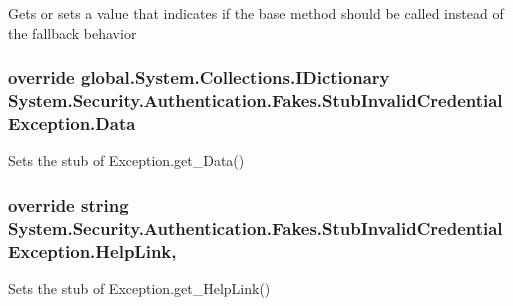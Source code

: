 Gets or sets a value that indicates if the base method should be called instead of the fallback behavior

\hypertarget{class_system_1_1_security_1_1_authentication_1_1_fakes_1_1_stub_invalid_credential_exception_ab93452db884dca68f86cb3597a185410}{
\subsubsection[{Data}]{\setlength{\rightskip}{0pt plus 5cm}override global.\-System.\-Collections.\-I\-Dictionary System.\-Security.\-Authentication.\-Fakes.\-Stub\-Invalid\-Credential\-Exception.\-Data\hspace{0.3cm}{\ttfamily [get]}}}\label{class_system_1_1_security_1_1_authentication_1_1_fakes_1_1_stub_invalid_credential_exception_ab93452db884dca68f86cb3597a185410}


Sets the stub of Exception.\-get\-\_\-\-Data()

\hypertarget{class_system_1_1_security_1_1_authentication_1_1_fakes_1_1_stub_invalid_credential_exception_a138dc0f03cbadf09704d4f7aee2df470}{
\subsubsection[{Help\-Link}]{\setlength{\rightskip}{0pt plus 5cm}override string System.\-Security.\-Authentication.\-Fakes.\-Stub\-Invalid\-Credential\-Exception.\-Help\-Link\hspace{0.3cm}{\ttfamily [get]}, {\ttfamily [set]}}}\label{class_system_1_1_security_1_1_authentication_1_1_fakes_1_1_stub_invalid_credential_exception_a138dc0f03cbadf09704d4f7aee2df470}


Sets the stub of Exception.\-get\-\_\-\-Help\-Link()


